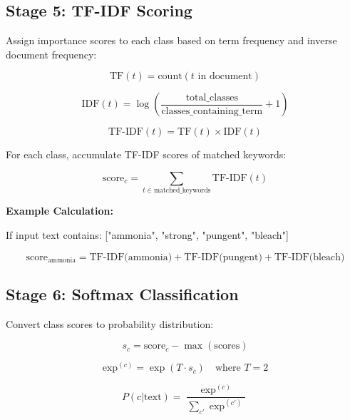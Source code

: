 \documentclass[10pt]{article}
\begin{document}
\subsection{Stage 5: TF-IDF Scoring}

Assign importance scores to each class based on term frequency and inverse document frequency:

\begin{equation}
\text{TF}(t) = \text{count}(t \text{ in document})
\end{equation}

\begin{equation}
\text{IDF}(t) = \log\left(\frac{\text{total\_classes}}{\text{classes\_containing\_term}} + 1\right)
\end{equation}

\begin{equation}
\text{TF-IDF}(t) = \text{TF}(t) \times \text{IDF}(t)
\end{equation}

For each class, accumulate TF-IDF scores of matched keywords:

\begin{equation}
\text{score}_c = \sum_{t \in \text{matched\_keywords}} \text{TF-IDF}(t)
\end{equation}

\textbf{Example Calculation:}

If input text contains: ["ammonia", "strong", "pungent", "bleach"]

\[
\text{score}_{\text{ammonia}} = \text{TF-IDF(ammonia)} + \text{TF-IDF(pungent)} + \text{TF-IDF(bleach)}
\]

\subsection{Stage 6: Softmax Classification}

Convert class scores to probability distribution:

\begin{equation}
s_c = \text{score}_c - \max(\text{scores})
\end{equation}

\begin{equation}
\text{exp}^{(c)} = \exp(T \cdot s_c) \quad \text{where } T = 2
\end{equation}

\begin{equation}
P(c|\text{text}) = \frac{\exp^{(c)}}{\sum_{c'} \exp^{(c')}}
\end{equation}
\end{document}

